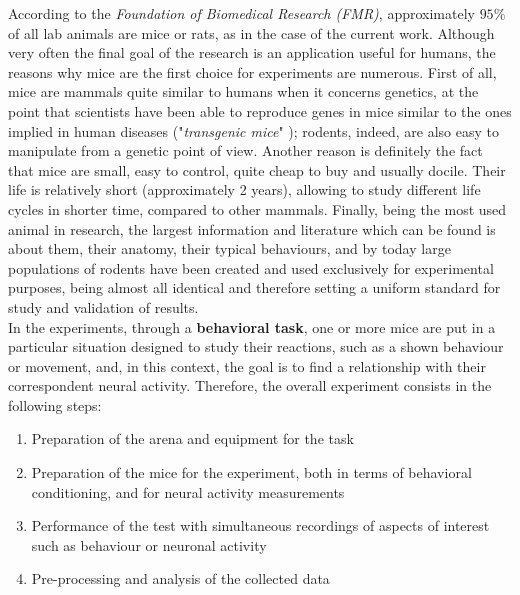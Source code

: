 \documentclass[12pt, a4paper]{report}
\begin{document}
According to the \textit{Foundation of Biomedical Research (FMR)}, approximately $95\% $ of all lab animals are mice or rats, as in the case of the current work. Although very often the final goal of the research is an application useful for humans, the reasons why mice are the first choice for experiments are numerous. First of all, mice are mammals quite similar to humans when it concerns genetics, at the point that scientists have been able to reproduce genes in mice similar to the ones implied in human diseases ("\textit{transgenic mice}" \cite{7}); %
 rodents, indeed, are also easy to manipulate from a genetic point of view. Another reason is definitely the fact that mice are small, easy to control, quite cheap to buy and usually docile. Their life is relatively short (approximately 2 years), allowing to study different life cycles in shorter time, compared to other mammals. Finally, being the most used animal in research, the largest information and literature which can be found is about them, their anatomy, their typical behaviours, and by today large populations of rodents have been created and used exclusively for experimental purposes, being almost all identical and therefore setting a uniform standard for study and validation of results. \\
In the experiments, through a  \textbf{behavioral task}, one or more mice are put in a particular situation designed to study their reactions, such as a shown behaviour or movement, and, in this context, the goal is to find a relationship with their correspondent neural activity. Therefore, the overall experiment consists in the following steps:
\begin{enumerate}
	\item Preparation of the arena and equipment for the task 
	\item Preparation of the mice for the experiment, both in terms of behavioral conditioning, and for neural activity measurements
	\item Performance of the test with simultaneous recordings of  aspects of interest such as behaviour or neuronal activity
	\item Pre-processing and analysis of the collected data
\end{enumerate}
\end{document}
